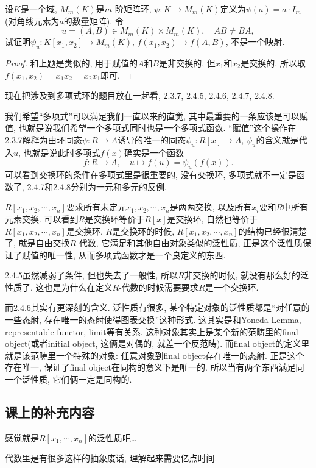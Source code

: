 \documentclass{../solutions-cn}
\begin{document}
\begin{exercise}[习题2.4.8]
    设$K$是一个域, $M_m(K)$是$m$-阶矩阵环, $\psi:K \to M_m(K)$定义为$\psi(a) = a \cdot I_{m}$(对角线元素为$a$的数量矩阵). 令
    \[
        u = (A, B) \in M_m(K) \times M_m(K),\quad AB \neq BA,
    \]
    试证明$\psi_u:K[x_1, x_2] \to M_m(K),\, f(x_1, x_2) \mapsto f(A, B)$, 不是一个映射.
\end{exercise}

\begin{proof}
    和上题是类似的, 用于赋值的$A$和$B$是非交换的, 但$x_1$和$x_2$是交换的. 所以取$f(x_1, x_2) = x_1x_2 = x_2x_1$即可.
\end{proof}

\begin{remark}
    现在把涉及到多项式环的题目放在一起看, 2.3.7, 2.4.5, 2.4.6, 2.4.7, 2.4.8.
    
    我们希望“多项式”可以满足我们一直以来的直觉, 其中最重要的一条应该是可以赋值, 也就是说我们希望一个多项式同时也是一个多项式函数. “赋值”这个操作在2.3.7解释为由环同态$\psi:R \to A$诱导的唯一的同态$\psi_u:R[x] \to A$, $\psi_u$的含义就是代入$u$, 也就是说此时多项式$f(x)$确实是一个函数
    \[
        f:R \to A,\quad u \mapsto f(u) = \psi_u(f(x)).
    \]
    可以看到交换环的条件在多项式里是很重要的, 没有交换环, 多项式就不一定是函数了, 2.4.7和2.4.8分别为一元和多元的反例.
    
    $R[x_1, x_2, \cdots, x_n]$要求所有未定元$x_1, x_2, \cdots, x_n$是两两交换, 以及所有$x_i$要和$R$中所有元素交换. 可以看到$R$是交换环等价于$R[x]$是交换环, 自然也等价于$R[x_1, x_2, \cdots, x_n]$是交换环. $R$是交换环的时候, $R[x_1, x_2, \cdots, x_n]$的结构已经很清楚了, 就是自由交换$R$-代数, 它满足和其他自由对象类似的泛性质, 正是这个泛性质保证了赋值的唯一性, 从而多项式函数才是一个良定义的东西.

    2.4.5虽然减弱了条件, 但也失去了一般性, 所以$R$非交换的时候, 就没有那么好的泛性质了. 这也是为什么在定义$R$-代数的时候需要要求$R$是一个交换环.

    而2.4.6其实有更深刻的含义. 泛性质有很多, 某个特定对象的泛性质都是“对任意的一些态射, 存在唯一的态射使得图表交换”这种形式. 这其实是和Yoneda Lemma, representable functor, limit等有关系. 这种对象其实上是某个新的范畴里的final object(或者initial object, 这俩是对偶的, 就差一个反范畴). 而final object的定义里就是该范畴里一个特殊的对象: 任意对象到final object存在唯一的态射. 正是这个存在唯一, 保证了final object在同构的意义下是唯一的. 所以当有两个东西满足同一个泛性质, 它们俩一定是同构的.
\end{remark}

\subsection*{课上的补充内容}
感觉就是$R[x_1, \cdots, x_n]$的泛性质吧\dots

代数里是有很多这样的抽象废话, 理解起来需要亿点时间.
\end{document}
